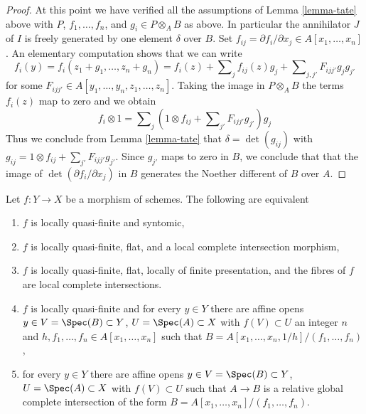 \begin{proof}
\medskip\noindent
At this point we have verified all the assumptions of Lemma \ref{lemma-tate}
above with $P$, $f_1, \ldots, f_n$, and $g_i \in P \otimes_A B$ as above.
In particular the annihilator $J$ of $I$ is freely generated by one
element $\delta$ over $B$.
Set $f_{ij} = \partial f_i/\partial x_j \in A[x_1, \ldots, x_n]$.
An elementary computation shows that we can write
$$
f_i(y) =
f_i(z_1 + g_1, \ldots, z_n + g_n) =
f_i(z) + \sum\nolimits_j f_{ij}(z) g_j +
\sum\nolimits_{j, j'} F_{ijj'}g_jg_{j'}
$$
for some $F_{ijj'} \in A[y_1, \ldots, y_n, z_1, \ldots, z_n]$.
Taking the image in $P \otimes_A B$ the terms $f_i(z)$ map to
zero and we obtain
$$
f_i \otimes 1 = \sum\nolimits_j
\left(1 \otimes f_{ij} + \sum\nolimits_{j'} F_{ijj'}g_{j'}\right)g_j
$$
Thus we conclude from Lemma \ref{lemma-tate}
that $\delta = \det(g_{ij})$ with
$g_{ij} = 1 \otimes f_{ij} + \sum_{j'} F_{ijj'}g_{j'}$.
Since $g_{j'}$ maps to zero in $B$, we conclude that
that the image of $\det(\partial f_i/\partial x_j)$ in $B$
generates the Noether different of $B$ over $A$.
\end{proof}

\begin{lemma}
\label{lemma-syntomic-quasi-finite}
Let $f : Y \to X$ be a morphism of schemes. The following are equivalent
\begin{enumerate}
\item $f$ is locally quasi-finite and syntomic,
\item $f$ is locally quasi-finite, flat, and a local complete intersection
morphism,
\item $f$ is locally quasi-finite, flat, locally of finite presentation,
and the fibres of $f$ are local complete intersections.
\item $f$ is locally quasi-finite and for every $y \in Y$ there are
affine opens $y \in V = \Spec(B) \subset Y$, $U = \Spec(A) \subset X$
with $f(V) \subset U$ an integer $n$ and
$h, f_1, \ldots, f_n \in A[x_1, \ldots, x_n]$ such that
$B = A[x_1, \ldots, x_n, 1/h]/(f_1, \ldots, f_n)$,
\item for every $y \in Y$ there are affine opens
$y \in V = \Spec(B) \subset Y$, $U = \Spec(A) \subset X$
with $f(V) \subset U$ such that $A \to B$ is a relative global complete
intersection of the form $B = A[x_1, \ldots, x_n]/(f_1, \ldots, f_n)$.
\end{enumerate}
\end{lemma}

